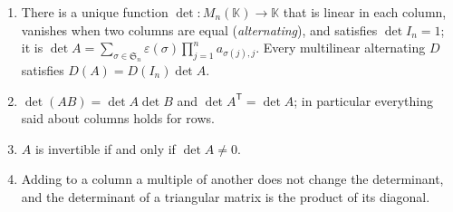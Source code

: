 \begin{theorem}[determinant]\label{thm:det}
\begin{enumerate}[label=(\alph*)]
\item There is a unique function $\det:M_n(\mathbb K)\to\mathbb K$ that is linear in each column, vanishes when two columns are equal (\emph{alternating}), and satisfies $\det I_n=1$; it is $\det A=\sum_{\sigma\in\mathfrak S_n}\varepsilon(\sigma)\prod_{j=1}^na_{\sigma(j),j}$. Every multilinear alternating $D$ satisfies $D(A)=D(I_n)\det A$.
\item $\det(AB)=\det A\det B$ and $\det A^{\mathsf T}=\det A$; in particular everything said about columns holds for rows.
\item $A$ is invertible if and only if $\det A\ne0$.
\item Adding to a column a multiple of another does not change the determinant, and the determinant of a triangular matrix is the product of its diagonal.
\end{enumerate}
\end{theorem}

